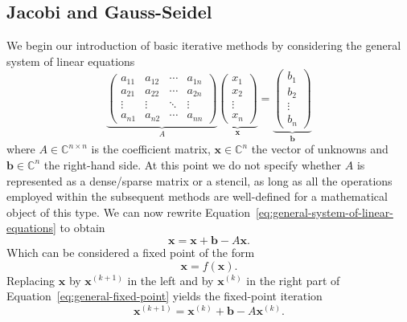 \subsection{Jacobi and Gauss-Seidel} 
We begin our introduction of basic iterative methods by considering the general system of linear equations
\begin{equation}
	\underbrace{
	\begin{pmatrix}a_{11}&a_{12}&\cdots &a_{1n}\\a_{21}&a_{22}&\cdots &a_{2n}\\\vdots &\vdots &\ddots &\vdots \\a_{n1}&a_{n2}&\cdots &a_{nn}\end{pmatrix}}_{A}
\underbrace{\begin{pmatrix}
		x_1 \\ x_2 \\ \vdots \\ x_n
\end{pmatrix}}_{\bm{x}} = 
\underbrace{\begin{pmatrix}
		b_1 \\ b_2 \\ \vdots \\ b_n
\end{pmatrix}}_{\bm{b}}
	\label{eq:general-system-of-linear-equations}
\end{equation}
where $A \in \mathbb{C}^{n \times n}$ is the coefficient matrix, $\bm x \in \mathbb{C}^n$ the vector of unknowns and $\bm b \in \mathbb{C}^n$ the right-hand side.
At this point we do not specify whether $A$ is represented as a dense/sparse matrix or a stencil, as long as all the operations employed within the subsequent methods are well-defined for a mathematical object of this type.
We can now rewrite Equation~\eqref{eq:general-system-of-linear-equations} to obtain
\begin{equation}
	\bm{x} = \bm{x} + \bm b - A \bm{x}.
	\label{eq:general-fixed-point}
\end{equation}
Which can be considered a fixed point of the form
\begin{equation}
	\bm x = f(\bm x).
\end{equation} 
Replacing $\bm x$ by $\bm{x}^{(k+1)}$ in the left and by $\bm{x}^{(k)}$ in the right part of Equation~\eqref{eq:general-fixed-point} yields the fixed-point iteration
\begin{equation}
	\bm{x}^{(k+1)} = \bm{x}^{(k)} + \bm b - A \bm{x}^{(k)}.
	\label{eq:richardson-iteration}
\end{equation}
